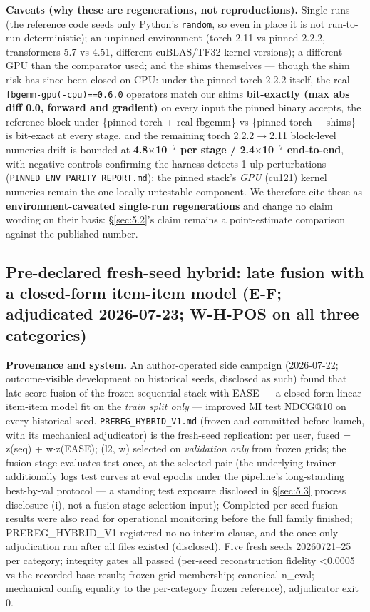 \textbf{Caveats (why these are regenerations, not reproductions).} Single runs (the reference code seeds only Python's \texttt{random}, so even in place it is not run-to-run deterministic); an unpinned environment (torch 2.11 vs pinned 2.2.2, transformers 5.7 vs 4.51, different cuBLAS/TF32 kernel versions); a different GPU than the comparator used; and the shims themselves --- though the shim risk has since been closed on CPU: under the pinned torch 2.2.2 itself, the real \texttt{fbgemm-gpu(-cpu)==0.6.0} operators match our shims \textbf{bit-exactly (max abs diff 0.0, forward and gradient)} on every input the pinned binary accepts, the reference block under \{pinned torch + real fbgemm\} vs \{pinned torch + shims\} is bit-exact at every stage, and the remaining torch 2.2.2\ensuremath{\rightarrow}2.11 block-level numerics drift is bounded at \textbf{4.8\ensuremath{\times}10\ensuremath{^{-7}} per stage / 2.4\ensuremath{\times}10\ensuremath{^{-7}} end-to-end}, with negative controls confirming the harness detects 1-ulp perturbations (\texttt{PINNED\_ENV\_PARITY\_REPORT.md}); the pinned stack's \emph{GPU} (cu121) kernel numerics remain the one locally untestable component. We therefore cite these as \textbf{environment-caveated single-run regenerations} and change no claim wording on their basis: \S\ref{sec:5.2}'s claim remains a point-estimate comparison against the published number.

\subsection{Pre-declared fresh-seed hybrid: late fusion with a closed-form item-item model (E-F; adjudicated 2026-07-23; W-H-POS on all three categories)}\label{sec:5.7}

\textbf{Provenance and system.} An author-operated side campaign (2026-07-22; outcome-visible development on historical seeds, disclosed as such) found that late score fusion of the frozen sequential stack with EASE \citep{steck2019ease} --- a closed-form linear item-item model fit on the \emph{train split only} --- improved MI test NDCG@10 on every historical seed. \texttt{PREREG\_HYBRID\_V1.md} (frozen and committed before launch, with its mechanical adjudicator) is the fresh-seed replication: per user, fused = z(seq) + w\ensuremath{\cdot}z(EASE); (l2, w) selected on \emph{validation only} from frozen grids; the fusion stage evaluates test once, at the selected pair (the underlying trainer additionally logs test curves at eval epochs under the pipeline's long-standing best-by-val protocol --- a standing test exposure disclosed in \S\ref{sec:5.3} process disclosure (i), not a fusion-stage selection input); Completed per-seed fusion results were also read for operational monitoring before the full family finished; PREREG\_HYBRID\_V1 registered no no-interim clause, and the once-only adjudication ran after all files existed (disclosed). Five fresh seeds 20260721--25 per category; integrity gates all passed (per-seed reconstruction fidelity <0.0005 vs the recorded base result; frozen-grid membership; canonical n\_eval; mechanical config equality to the per-category frozen reference), adjudicator exit 0.

